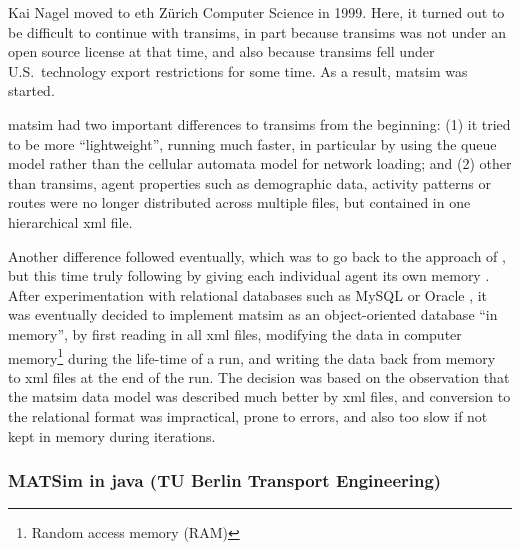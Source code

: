 Kai Nagel moved to \gls{eth} Zürich Computer Science in 1999.  Here, it turned out to be difficult to continue with \gls{transims}, in part because \gls{transims} was not under an open source license at that time, and also because \gls{transims} fell under U.S.\ technology export restrictions for some time.  As a result, \gls{matsim} was started.

\gls{matsim} had two important differences to \gls{transims} from the beginning: (1) it tried to be more ``lightweight'', \ie running much faster, in particular by using the queue model \citep{Gawron_IJMPC_1998,Gawron1998IterativeAlgorithmto} rather than the cellular automata model for network loading; and (2) other than \gls{transims}, agent properties such as demographic data, activity patterns or routes were no longer distributed across multiple files, but contained in one hierarchical \gls{xml} file.

Another difference followed eventually, which was to go back to the approach of \citet{Nagel1996NRW}, but this time truly following \citet{ArthurBar} by giving each individual agent its own memory \citep{RaneyNagel2006traf-framework}.  After experimentation with relational databases such as MySQL \citep{mysql-wikipedia} or Oracle \citep{oracle}, it was eventually decided to implement \gls{matsim} as an object-oriented database ``in memory'', \ie by first reading in all \gls{xml} files, modifying the data in computer memory\footnote{Random access memory (RAM)} during the life-time of a run, and writing the data back from memory to \gls{xml} files at the end of the run.  The decision was based on the observation that the \gls{matsim} data model was described much better by \gls{xml} files, and conversion to the relational format was impractical, prone to errors, and also too slow if not kept in memory during iterations. 

\subsubsection{MATSim in \protect\gls{java} (TU Berlin Transport Engineering)}
\label{sec:matsim-in-java}


